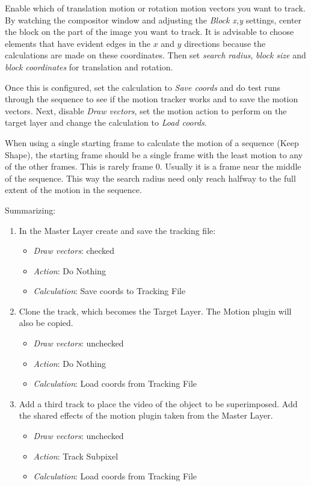 Enable which of translation motion or rotation motion vectors you want to track. By watching the compositor window and adjusting the \textit{Block x,y} settings, center the block on the part of the image you want to track. It is advisable to choose elements that have evident edges in the $x$ and $y$ directions because the calculations are made on these coordinates. Then set \textit{search radius}, \textit{block size} and \textit{block coordinates} for translation and rotation.

Once this is configured, set the calculation to \textit{Save coords} and do test runs through the sequence to see if the motion tracker works and to save the motion vectors. Next, disable \textit{Draw vectors}, set the motion action to perform on the target layer and change the calculation to \textit{Load coords}.

When using a single starting frame to calculate the motion of a sequence (Keep Shape), the starting frame should be a single frame with the least motion to any of the other frames. This is rarely frame $0$. Usually it is a frame near the middle of the sequence. This way the search radius need only reach halfway to the full extent of the motion in the sequence.

Summarizing:

\begin{enumerate}
	\item In the Master Layer create and save the tracking file:
	\begin{itemize}
		\item \textit{Draw vectors}: checked
		\item \textit{Action}: Do Nothing
		\item \textit{Calculation}: Save coords to Tracking File
	\end{itemize}
	\item Clone the track, which becomes the Target Layer. The Motion plugin will also be copied.
		\begin{itemize}
			\item \textit{Draw vectors}: unchecked
			\item \textit{Action}: Do Nothing
			\item \textit{Calculation}: Load coords from Tracking File
		\end{itemize}
	\item Add a third track to place the video of the object to be superimposed. Add the shared effects of the motion plugin taken from the Master Layer.
		\begin{itemize}
			\item \textit{Draw vectors}: unchecked
			\item \textit{Action}: Track Subpixel
			\item \textit{Calculation}: Load coords from Tracking File
		\end{itemize}
\end{enumerate}

